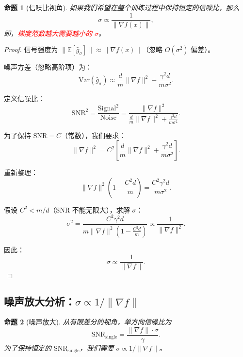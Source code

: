 \documentclass{article}
\newtheorem{proposition}{命题}
\begin{document}
\begin{proposition}[信噪比视角]
如果我们希望在整个训练过程中保持恒定的信噪比，那么
\[
\boxed{\sigma \propto \frac{1}{\|\nabla f(x)\|}},
\]
即，\textcolor{red}{梯度范数越大需要越小的 $\sigma$}。
\end{proposition}

\begin{proof}
信号强度为 $\|\mathbb{E}[\widehat{g}_\sigma]\| \approx \|\nabla f(x)\|$（忽略 $O(\sigma^2)$ 偏差）。

噪声方差（忽略高阶项）为：
\[
\text{Var}(\widehat{g}_\sigma) \approx \frac{d}{m}\|\nabla f\|^2 + \frac{\gamma^2 d}{m\sigma^2}.
\]

定义信噪比：
\[
\text{SNR}^2 = \frac{\text{Signal}^2}{\text{Noise}} = \frac{\|\nabla f\|^2}{\frac{d}{m}\|\nabla f\|^2 + \frac{\gamma^2 d}{m\sigma^2}}.
\]

为了保持 $\text{SNR} = C$（常数），我们要求：
\[
\|\nabla f\|^2 = C^2\left[\frac{d}{m}\|\nabla f\|^2 + \frac{\gamma^2 d}{m\sigma^2}\right].
\]

重新整理：
\[
\|\nabla f\|^2\left(1 - \frac{C^2 d}{m}\right) = \frac{C^2\gamma^2 d}{m\sigma^2}.
\]

假设 $C^2 < m/d$（SNR 不能无限大），求解 $\sigma$：
\[
\sigma^2 = \frac{C^2\gamma^2 d}{m\|\nabla f\|^2\left(1 - \frac{C^2 d}{m}\right)}
\propto \frac{1}{\|\nabla f\|^2}.
\]

因此：
\[
\boxed{\sigma \propto \frac{1}{\|\nabla f\|}.}
\]
\end{proof}

\subsection{噪声放大分析：$\sigma \propto 1/\|\nabla f\|$}

\begin{proposition}[噪声放大]
从有限差分的视角，单方向信噪比为
\[
\text{SNR}_{\text{single}} = \frac{\|\nabla f\|\cdot\sigma}{\gamma}.
\]
为了保持恒定的 $\text{SNR}_{\text{single}}$，我们需要 $\sigma \propto 1/\|\nabla f\|$。
\end{proposition}
\end{document}
